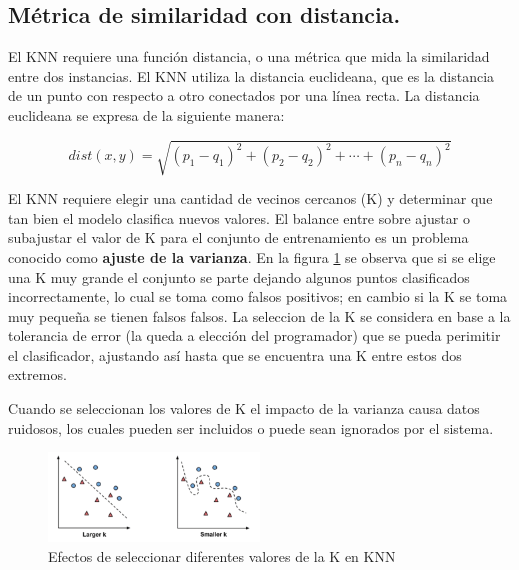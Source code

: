 \subsection{Métrica de similaridad con distancia.}

El KNN requiere una función distancia, o una métrica que mida la similaridad entre dos instancias. El KNN utiliza la distancia euclideana, que es la distancia de un punto con respecto a otro conectados por una línea recta. La distancia euclideana se expresa de la siguiente manera:

\begin{equation}
dist(x,y) = \sqrt{(p_1-q_1)^2 + (p_2-q_2)^2+ \cdots + (p_n - q_n)^2}
\end{equation}

El KNN requiere elegir una cantidad de vecinos cercanos (K) y determinar que tan bien el modelo clasifica nuevos valores. El balance entre sobre ajustar o subajustar el valor de K para el conjunto de entrenamiento es un problema conocido como \textbf{ajuste de la varianza}. En la figura \ref{fig:seleccionK} se observa que si se elige una K muy grande el conjunto se parte dejando algunos puntos clasificados incorrectamente, lo cual se toma como falsos positivos; en cambio si la K se toma muy pequeña se tienen falsos falsos. 
La seleccion de la K se considera en base a la tolerancia de error (la queda a elección  del programador) que se pueda perimitir el clasificador, ajustando así hasta que se encuentra una K entre estos dos extremos.

Cuando se seleccionan los valores de K el impacto de la varianza causa datos ruidosos, los cuales pueden ser incluidos o puede sean ignorados por el sistema.


\begin{figure}[ht]
\centering
\includegraphics[width=0.5\textwidth]{IMG_0061.png}
\caption{Efectos de seleccionar diferentes valores  de la K en KNN}
\label{fig:seleccionK}
\end{figure}


